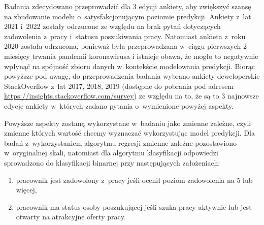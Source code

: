 Badania zdecydowano przeprowadzić dla 3 edycji ankiety, aby zwiększyć szansę na zbudowanie modelu o~satysfakcjonującym poziomie predykcji.
Ankiety z~lat 2021 i~2022 zostały odrzucone ze względu na brak pytań dotyczących zadowolenia z~pracy i~statusu poszukiwania pracy.
Natomiast ankieta z~roku 2020 została odrzucona, ponieważ była przeprowadzana w~ciągu pierwszych 2 miesięcy trwania pandemii koronawirusa
i istnieje obawa, że mogło to negatywnie wpłynąć na spójność zbioru danych w~kontekście modelowania predykcji.
Biorąc powyższe pod uwagę, do przeprowadzenia badania wybrano ankiety deweloperskie StackOverflow z~lat 2017, 2018, 2019 (dostępne do pobrania pod adresem \url{https://insights.stackoverflow.com/survey}) ze względu na to, że są to 3 najnowsze edycje ankiety w~których zadano pytania o~wymienione powyżej aspekty.

Powyższe aspekty zostaną wykorzystane w~badaniu jako zmienne zależne, czyli zmienne których wartość chcemy wyznaczać wykorzystując model predykcji.
Dla badań z~wykorzystaniem algorytmu regresji zmienne zależne pozostawiono w~oryginalnej skali,
natomiast dla algorytmu klasyfikacji odpowiedzi sprowadzono do klasyfikacji binarnej przy następujących założeniach:
\begin{enumerate}
    \item pracownik jest zadowolony z~pracy jeśli ocenił poziom zadowolenia na 5 lub więcej,
    \item pracownik ma status osoby poszukującej jeśli szuka pracy aktywnie lub jest otwarty na atrakcyjne oferty pracy.
\end{enumerate}

